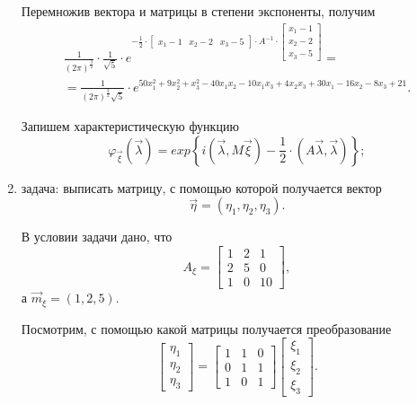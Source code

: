 \begin{enumerate}[label=\alph*)]
  Перемножив вектора и матрицы в степени экспоненты, получим
  \begin{equation*}
    \begin{split}
      \frac{1}{ \left( 2 \pi \right)^{ \frac{3}{2}}} \cdot \frac{1}{ \sqrt{5}} \cdot
      e^{- \frac{1}{2} \cdot
        \begin{bmatrix}
          x_1 - 1 & x_2 - 2 & x_3 - 5
        \end{bmatrix} \cdot A^{-1} \cdot
        \begin{bmatrix}
          x_1 - 1 \\
          x_2 - 2 \\
          x_3 - 5
        \end{bmatrix}} = \\
      = \frac{1}{ \left( 2 \pi \right)^{ \frac{3}{2}} \sqrt{5}} \cdot
      e^{50x_1^2 + 9x_2^2 + x_3^2 - 40x_1 x_2 - 10x_1 x_3 + 4x_2 x_3 + 30x_1 - 16x_2 - 8x_3 + 21}.
    \end{split}
  \end{equation*}

  Запишем характеристическую функцию
  $$ \varphi_{ \vec{ \xi }} \left( \vec{ \lambda } \right) =
    exp \left\{
      i \left( \vec{ \lambda }, M \vec{ \xi } \right) -
      \frac{1}{2} \cdot \left( A \vec{ \lambda }, \vec{ \lambda }
    \right) \right\};$$
  \item задача: выписать матрицу,
  с помощью которой получается вектор
  $$ \vec{ \eta } =
    \left( \eta_1, \eta_2, \eta_3 \right).$$

  В условии задачи дано, что
  $$A_{ \xi } =
    \begin{bmatrix}
      1 & 2 & 1 \\
      2 & 5 & 0 \\
      1 & 0 & 10
    \end{bmatrix},$$
  а $ \vec{m}_{ \xi } = \left( 1, 2, 5 \right) $.

  Посмотрим, с помощью какой матрицы получается преобразование
  $$ \begin{bmatrix}
      \eta_1 \\
      \eta_2 \\
      \eta_3
    \end{bmatrix} =
    \begin{bmatrix}
      1 & 1 & 0 \\
      0 & 1 & 1 \\
      1 & 0 & 1
    \end{bmatrix}
    \begin{bmatrix}
      \xi_1 \\
      \xi_2 \\
      \xi_3
    \end{bmatrix}.$$


\end{enumerate}

